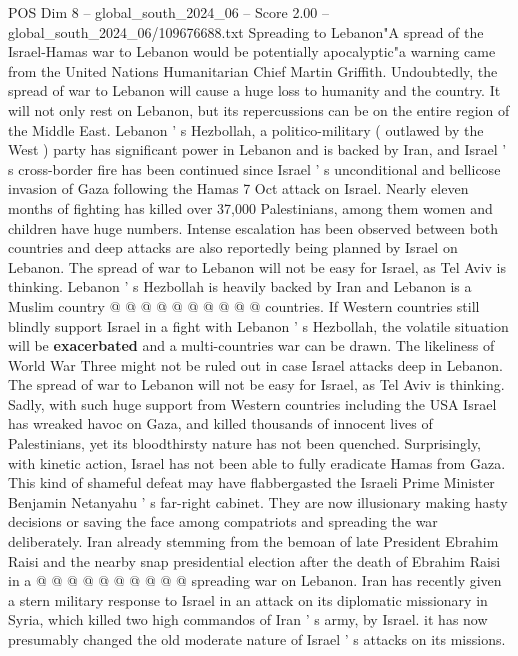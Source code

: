 \begin{textsample}{POS Dim 8 – global\_south\_2024\_06 – Score 2.00 – global\_south\_2024\_06/109676688.txt}  \label{ex:f8_pos_407}
Spreading to Lebanon"A spread of the Israel-Hamas war to Lebanon would be potentially apocalyptic"a warning came from the United Nations Humanitarian Chief Martin Griffith.
Undoubtedly, the spread of war to Lebanon will cause a huge loss to humanity and the country.
It will not only rest on Lebanon, but its repercussions can be on the entire region of the Middle East.
Lebanon ' s Hezbollah, a politico-military ( outlawed by the West ) party has significant power in Lebanon and is backed by Iran, and Israel ' s cross-border fire has been continued since Israel ' s unconditional and bellicose invasion of Gaza following the Hamas 7 Oct attack on Israel.
Nearly eleven months of fighting has killed over 37,000 Palestinians, among them women and children have huge numbers.
Intense escalation has been observed between both countries and deep attacks are also reportedly being planned by Israel on Lebanon.
The spread of war to Lebanon will not be easy for Israel, as Tel Aviv is thinking.
Lebanon ' s Hezbollah is heavily backed by Iran and Lebanon is a Muslim country @ @ @ @ @ @ @ @ @ @ countries.
If Western countries still blindly support Israel in a fight with Lebanon ' s Hezbollah, the volatile situation will be \textbf{exacerbated} and a multi-countries war can be drawn.
The likeliness of World War Three might not be ruled out in case Israel attacks deep in Lebanon.
The spread of war to Lebanon will not be easy for Israel, as Tel Aviv is thinking.
Sadly, with such huge support from Western countries including the USA Israel has wreaked havoc on Gaza, and killed thousands of innocent lives of Palestinians, yet its bloodthirsty nature has not been quenched.
Surprisingly, with kinetic action, Israel has not been able to fully eradicate Hamas from Gaza.
This kind of shameful defeat may have flabbergasted the Israeli Prime Minister Benjamin Netanyahu ' s far-right cabinet.
They are now illusionary making hasty decisions or saving the face among compatriots and spreading the war deliberately.
Iran already stemming from the bemoan of late President Ebrahim Raisi and the nearby snap presidential election after the death of Ebrahim Raisi in a @ @ @ @ @ @ @ @ @ @ spreading war on Lebanon.
Iran has recently given a stern military response to Israel in an attack on its diplomatic missionary in Syria, which killed two high commandos of Iran ' s army, by Israel. it has now presumably changed the old moderate nature of Israel ' s attacks on its missions.

\end{textsample}
